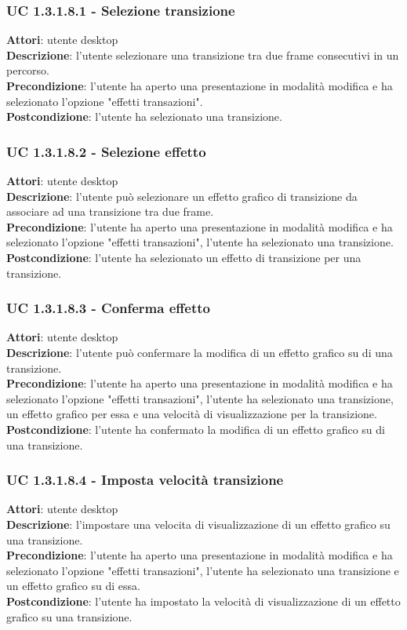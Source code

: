 \subsubsection{UC 1.3.1.8.1 - Selezione transizione}{
	\label{uc1.3.1..8.1}
	\textbf{Attori}: utente desktop \\
	\textbf{Descrizione}: l'utente selezionare una transizione tra due frame consecutivi in un percorso. \\
	\textbf{Precondizione}: l'utente ha aperto una presentazione in modalità modifica e ha selezionato l'opzione "effetti transazioni".	\\
	\textbf{Postcondizione}: l'utente ha selezionato una transizione.	\\
}
\subsubsection{UC 1.3.1.8.2 - Selezione effetto}{
	\label{uc1.3.1.8.2}
	\textbf{Attori}: utente desktop \\
	\textbf{Descrizione}: l'utente può selezionare un effetto grafico di transizione da associare ad una transizione tra due frame. \\
	\textbf{Precondizione}: l'utente ha aperto una presentazione in modalità modifica e ha selezionato l'opzione "effetti transazioni", l'utente ha selezionato una transizione.	\\
	\textbf{Postcondizione}: l'utente ha selezionato un effetto di transizione per una transizione.	\\
}
\subsubsection{UC 1.3.1.8.3 - Conferma effetto}{
	\label{uc1.3.1.8.3}
	\textbf{Attori}: utente desktop \\
	\textbf{Descrizione}: l'utente può confermare la modifica di un effetto grafico su di una transizione. \\
	\textbf{Precondizione}: l'utente ha aperto una presentazione in modalità modifica e ha selezionato l'opzione "effetti transazioni", l'utente ha selezionato una transizione, un effetto grafico per essa e una velocità di visualizzazione per la transizione.	\\
	\textbf{Postcondizione}: l'utente ha confermato la modifica di un effetto grafico su di una transizione.	\\
}
\subsubsection{UC 1.3.1.8.4 - Imposta velocità transizione}{
	\label{uc1.3.1..8.4}
	\textbf{Attori}: utente desktop \\
	\textbf{Descrizione}: l'impostare una velocita di visualizzazione di un effetto grafico su una transizione. \\
	\textbf{Precondizione}: l'utente ha aperto una presentazione in modalità modifica e ha selezionato l'opzione "effetti transazioni", l'utente ha selezionato una transizione e un effetto grafico su di essa.	\\
	\textbf{Postcondizione}: l'utente ha impostato la velocità di visualizzazione di un effetto grafico su una transizione.	\\
}
